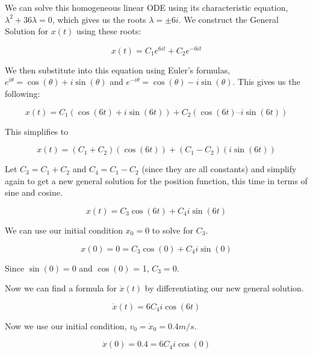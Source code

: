 \documentclass[11pt,answers]{exam}
\begin{document}
\begin{questions}
\begin{solution}
We can solve this homogeneous linear ODE using its characteristic equation, $\lambda^{2} + 36\lambda = 0$, which gives us the roots $\lambda = \pm 6i$. We construct the General Solution for $x(t)$ using these roots:

\begin{equation}
x(t) = C_{1}e^{6it} + C_{2}e^{-6it}
\end{equation}

We then substitute into this equation using Euler’s formulas, $e^{i\theta} = \cos{(\theta)} + i\sin{(\theta)}$ and $e^{-i\theta} = \cos{(\theta)} - i\sin{(\theta)}$. This gives us the following:

\begin{equation}
x(t) = C_{1}(\cos{(6t)} + i\sin{(6t)}) + C_{2}(\cos{(6t)} – i\sin{(6t)})
\end{equation}

This simplifies to

\begin{equation}
x(t) = (C_{1} + C_{2}) (\cos{(6t)}) + (C_{1} - C_{2}) (i\sin{(6t)})
\end{equation}

Let $C_{3} = C_{1} + C_{2}$ and $C_{4} = C_{1} - C_{2}$ (since they are all constants) and simplify again to get a new general solution for the position function, this time in terms of sine and cosine.

\begin{equation}
x(t) = C_{3} \cos{(6t)} + C_{4} i \sin{(6t)}
\end{equation}

We can use our initial condition $x_{0} = 0$ to solve for $C_{3}$.

\begin{equation}
x(0) = 0 = C_{3} \cos{(0)} + C_{4} i \sin{(0)}
\end{equation}

Since $\sin{(0)} = 0$ and $\cos{(0)}$ = 1, $C_{3} = 0$.

Now we can find a formula for $\dot{x}(t)$ by differentiating our new general solution.

\begin{equation}
\dot{x}(t) = 6 C_{4} i \cos{(6t)}
\end{equation}

Now we use our initial condition, $v_{0} = \dot{x}_{0} = 0.4 m/s$.

\begin{equation}
\dot{x}(0) = 0.4 = 6 C_{4} i \cos{(0)}
\end{equation}


\end{solution}
\end{questions}
\end{document}

